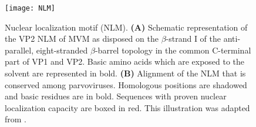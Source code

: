 \begin{figure}
\centering
  \texttt{[image: NLM]}
  \caption[Nuclear localisation motif (NLM)]
   {Nuclear localization motif (NLM). \textbf{(A)} Schematic representation of the VP2 NLM of MVM as disposed on the $\beta$-strand I of the anti-parallel, eight-stranded $\beta$-barrel topology in the common C-terminal part of VP1 and VP2. Basic amino acids which are exposed to the solvent are represented in bold. \textbf{(B)} Alignment of the NLM that is conserved among parvoviruses. Homologous positions are shadowed and basic residues are in bold. Sequences with proven nuclear localization capacity are boxed in red. This illustration was adapted from \cite{pmid10729155, almendral}.} 
\label{NLM}
\end{figure}


